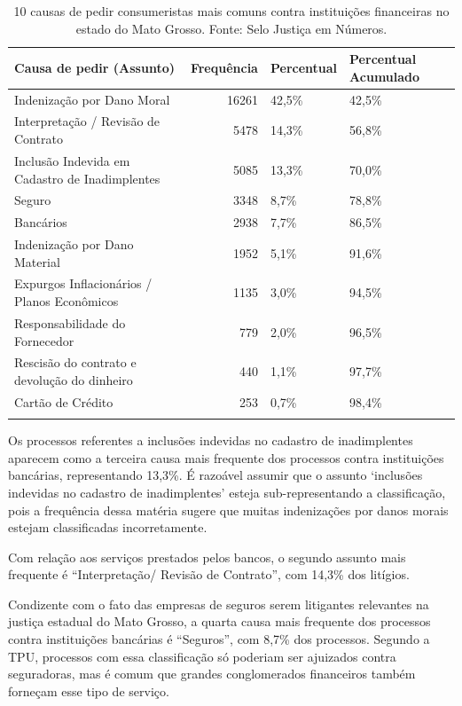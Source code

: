 \documentclass[]{report}
\begin{document}
\begin{longtable}{lrll}
\caption{10 causas de pedir consumeristas mais comuns contra instituições financeiras no estado do Mato Grosso. Fonte: Selo Justiça em Números.} \\
  \hline
Causa de pedir (Assunto) & Frequência & Percentual & Percentual Acumulado \\
  \hline
Indenização por Dano Moral & 16261 & 42,5\% & 42,5\% \\
  Interpretação / Revisão de Contrato & 5478 & 14,3\% & 56,8\% \\
  Inclusão Indevida em Cadastro de Inadimplentes & 5085 & 13,3\% & 70,0\% \\
  Seguro & 3348 & 8,7\% & 78,8\% \\
  Bancários & 2938 & 7,7\% & 86,5\% \\
  Indenização por Dano Material & 1952 & 5,1\% & 91,6\% \\
  Expurgos Inflacionários / Planos Econômicos & 1135 & 3,0\% & 94,5\% \\
  Responsabilidade do Fornecedor & 779 & 2,0\% & 96,5\% \\
  Rescisão do contrato e devolução do dinheiro & 440 & 1,1\% & 97,7\% \\
  Cartão de Crédito & 253 & 0,7\% & 98,4\% \\
   \hline
\hline
\label{unnamed-chunk-45}
\end{longtable}

Os processos referentes a inclusões indevidas no cadastro de
inadimplentes aparecem como a terceira causa mais frequente dos
processos contra instituições bancárias, representando 13,3\%. É
razoável assumir que o assunto `inclusões indevidas no cadastro de
inadimplentes' esteja sub-representando a classificação, pois a
frequência dessa matéria sugere que muitas indenizações por danos morais
estejam classificadas incorretamente.

Com relação aos serviços prestados pelos bancos, o segundo assunto mais
frequente é ``Interpretação/ Revisão de Contrato'', com 14,3\% dos
litígios.

Condizente com o fato das empresas de seguros serem litigantes
relevantes na justiça estadual do Mato Grosso, a quarta causa mais
frequente dos processos contra instituições bancárias é ``Seguros'', com
8,7\% dos processos. Segundo a TPU, processos com essa classificação só
poderiam ser ajuizados contra seguradoras, mas é comum que grandes
conglomerados financeiros também forneçam esse tipo de serviço.
\end{document}
